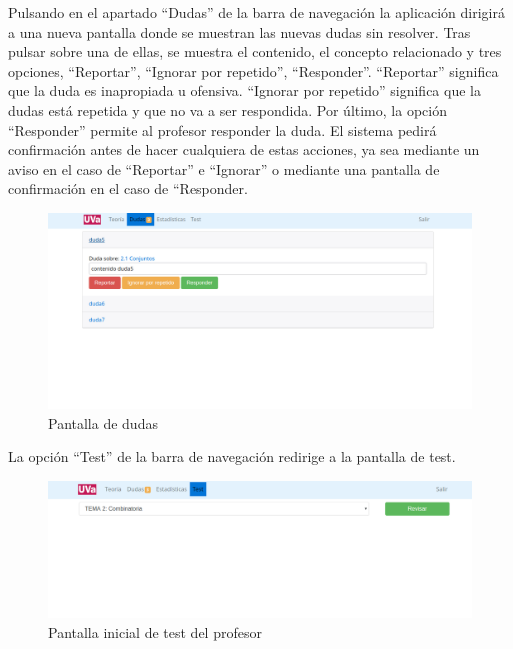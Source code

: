 \documentclass[openright,twoside,10pt]{book}
\begin{document}
    Pulsando en el apartado \enquote{Dudas} de la barra de navegación la
    aplicación dirigirá a una nueva pantalla donde se muestran las nuevas
    dudas sin resolver. Tras pulsar sobre una de ellas, se muestra el
    contenido, el concepto relacionado y tres opciones, \enquote{Reportar},
    \enquote{Ignorar por repetido}, \enquote{Responder}. \enquote{Reportar}
    significa que la duda es inapropiada u ofensiva. \enquote{Ignorar por
    repetido} significa que la dudas está repetida y que no va a ser
    respondida. Por último, la opción \enquote{Responder} permite al
    profesor responder la duda. El sistema pedirá confirmación antes de
    hacer cualquiera de estas acciones, ya sea mediante un aviso en el caso
    de \enquote{Reportar} e \enquote{Ignorar} o mediante una pantalla de
    confirmación en el caso de ``Responder.
    
    \begin{figure}[H]
        \begin{center}
            \includegraphics[width=\textwidth]{img/manual/profesor-dudas.png}
        \end{center}
        \caption{Pantalla de dudas}
    \end{figure}
    
    La opción \enquote{Test} de la barra de navegación redirige a la
    pantalla de test.
    
    \begin{figure}[H]
        \begin{center}
            \includegraphics[width=\textwidth]{img/manual/profesor-test.png}
        \end{center}
        \caption{Pantalla inicial de test del profesor}
    \end{figure}
    
\end{document}
